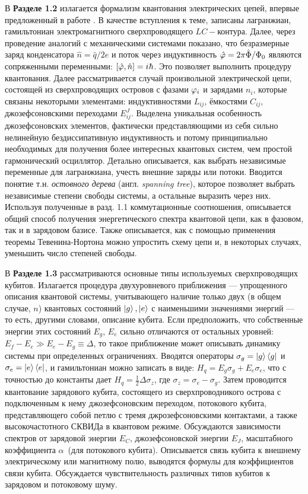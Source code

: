 В \textbf{Разделе 1.2} излагается формализм квантования электрических цепей, впервые предложенный в работе \cite{devoret1995quantum}. В качестве вступления к теме, записаны лагранжиан, гамильтониан электромагнитного сверхпроводящего $LC-$контура. Далее, через проведение аналогий с механическими системами показано, что безразмерные заряд конденсатора $\hat{n}=\hat{q}/2e$ и поток через индуктивность $\hat{\varphi}=2\pi\hat{\Phi}/\Phi_0$ являются сопряженными переменными: $[\hat{\vp},\hat{n}]=i\hbar$. Это позволяет выполнить процедуру квантования. Далее рассматривается случай произвольной электрической цепи, состоящей из сверхпроводящих островов с фазами $\varphi_i$ и зарядами $n_i$, которые связаны некоторыми элементами: индуктивностями $L_{ij}$, ёмкостями $C_{ij}$, джозефсоновскими переходами $E^J_{ij}$. Выделена уникальная особенность джозефсоновских элементов, фактически представляющими из себя сильно нелинейную бездиссипативную индуктивность и потому принципиально необходимых для получения более интересных квантовых систем, чем простой гармонический осциллятор. Детально описывается, как выбрать независимые переменные для лагранжиана, учесть внешние заряды или потоки. Вводится понятие т.н. \textit{остовного дерева} (англ. \textit{spanning tree}), которое позволяет выбрать независимые степени свободы системы, а остальные выразить через них. Используя полученные в разд. 1.1 коммутационные соотношения, описывается общий способ получения энергетического спектра квантовой цепи, как в фазовом, так и в зарядовом базисе. Также описывается, как с помощью применения теоремы Тевенина-Нортона можно упростить схему цепи и, в некоторых случаях, уменьшить число степеней свободы.

В \textbf{Разделе 1.3} рассматриваются основные типы используемых сверхпроводящих кубитов. Излагается процедура двухуровневого приближения --- упрощенного описания квантовой системы, учитывающего наличие только двух (в общем случае, $n$) квантовых состояний $\ket{g},\ket{e}$ с наименьшими значениями энергий --- то есть, другими словами, описание кубита. Если предположить, что собственные энергии этих состояний $E_g$, $E_e$ сильно отличаются от остальных уровней: $E_f-E_e\gg E_e-E_g \equiv \Delta$, то такое приближение может описывать динамику системы при определенных ограничениях. Вводятся операторы  $\sigma_g=\ket{g}\bra{g}$ и $\sigma_e = \ket{e}\bra{e}$,  и гамильтониан можно записать в виде: $H_q = E_g\sigma_g+E_e\sigma_e$, что с точностью до константы дает $H_q = \frac{1}{2}\Delta\sigma_z$, где $\sigma_z = \sigma_e-\sigma_g$. Затем проводится квантование зарядового кубита, состоящего из сверхпроводникого острова с подключенным к нему джозефсоновским переходом, потокового кубита, представляющего собой петлю с тремя джрозефсоновскими контактами, а также высокочастотного СКВИДа в квантовом режиме. Обсуждаются зависимости спектров от зарядовой энергии $E_C$, джозефсоновской энергии $E_J$, масштабного коэффициента $\alpha$~(для потокового кубита). Описывается связь кубита к внешнему электрическому или магнитному полю, выводятся формулы для коэффициентов связи кубита. Обсуждается чувствительность различных типов кубитов к зарядовом и потоковому шуму. 


